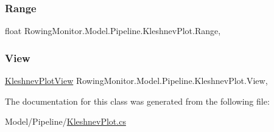 \subsubsection{\texorpdfstring{Range}{Range}}
{\footnotesize\ttfamily float Rowing\+Monitor.\+Model.\+Pipeline.\+Kleshnev\+Plot.\+Range\hspace{0.3cm}{\ttfamily [get]}, {\ttfamily [set]}}

\mbox{\label{class_rowing_monitor_1_1_model_1_1_pipeline_1_1_kleshnev_plot_a154ed82243dd60d53794d7aa2eaed202}} 
\subsubsection{\texorpdfstring{View}{View}}
{\footnotesize\ttfamily \hyperlink{class_rowing_monitor_1_1_view_1_1_kleshnev_plot_view}{Kleshnev\+Plot\+View} Rowing\+Monitor.\+Model.\+Pipeline.\+Kleshnev\+Plot.\+View\hspace{0.3cm}{\ttfamily [get]}, {\ttfamily [set]}}



The documentation for this class was generated from the following file\+:\begin{DoxyCompactItemize}
\item 
Model/\+Pipeline/\hyperlink{_kleshnev_plot_8cs}{Kleshnev\+Plot.\+cs}\end{DoxyCompactItemize}
